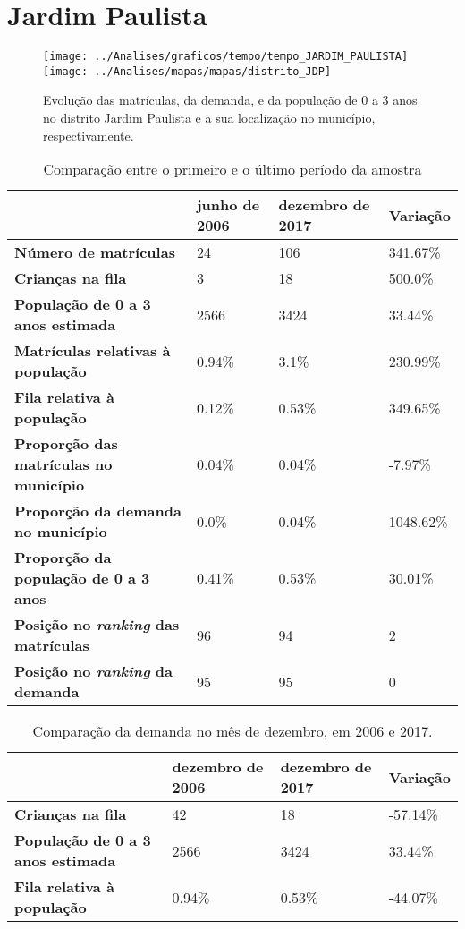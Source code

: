 \section{Jardim Paulista}
\begin{figure}[H]
\centering
\texttt{[image: ../Analises/graficos/tempo/tempo\_JARDIM\_PAULISTA]}
\texttt{[image: ../Analises/mapas/mapas/distrito\_JDP]}
\caption{Evolução das matrículas, da demanda, e da população de 0 a 3 anos no distrito Jardim Paulista e a sua localização no município, respectivamente.}
\end{figure}
\begin{table}[H]
\begin{tabular}{l|l|l|l}
\textbf{}                                      & \textbf{junho de 2006}       & \textbf{dezembro de 2017}    & \textbf{Variação} \\ \hline
\textbf{Número de matrículas}                  & 24 & 106 & 341.67\% \\ \hline
\textbf{Crianças na fila}                      & 3 & 18 & 500.0\% \\ \hline
\textbf{População de 0 a 3 anos estimada}      & 2566 & 3424 & 33.44\% \\ \hline
\textbf{Matrículas relativas à população}      & 0.94\% & 3.1\% & 230.99\% \\ \hline
\textbf{Fila relativa à população}             & 0.12\% & 0.53\% & 349.65\% \\ \hline
\textbf{Proporção das matrículas no município} & 0.04\% & 0.04\% & -7.97\% \\ \hline
\textbf{Proporção da demanda no município}     & 0.0\% & 0.04\% & 1048.62\% \\ \hline
\textbf{Proporção da população de 0 a 3 anos}  & 0.41\% & 0.53\% & 30.01\% \\ \hline
\textbf{Posição no \textit{ranking} das matrículas}     & 96 & 94 & 2 \\ \hline
\textbf{Posição no \textit{ranking} da demanda}         & 95 & 95 & 0 \\ 
\end{tabular}
\caption{Comparação entre o primeiro e o último período da amostra}
\end{table}
\begin{table}[H]
\begin{tabular}{l|l|l|l}
\textbf{}                                 & \textbf{dezembro de 2006} & \textbf{dezembro de 2017} & \textbf{Variação} \\ \hline
\textbf{Crianças na fila}                      & 42 & 18 & -57.14\% \\ \hline
\textbf{População de 0 a 3 anos estimada}      & 2566 & 3424 & 33.44\% \\ \hline
\textbf{Fila relativa à população}             & 0.94\% & 0.53\% & -44.07\% \\
\end{tabular}
\caption{Comparação da demanda no mês de dezembro, em 2006 e 2017.}
\end{table}
